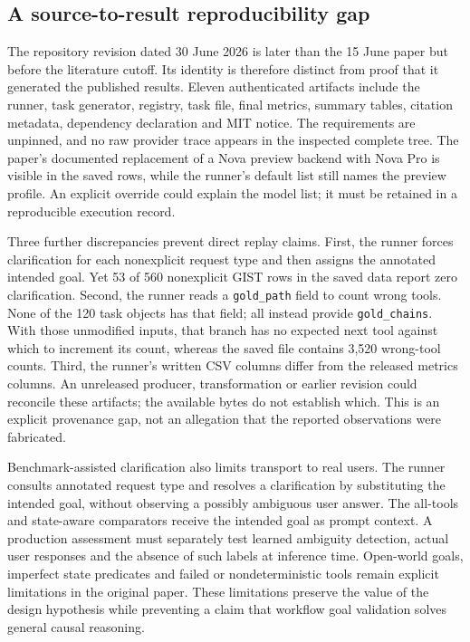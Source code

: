 \subsection{A source-to-result reproducibility gap}
\label{exec23:gist-provenance}
The repository revision dated 30 June 2026 is later than the 15 June paper
but before the literature cutoff. Its identity is therefore distinct from
proof that it generated the published results. Eleven authenticated artifacts
include the runner, task generator, registry, task file, final metrics,
summary tables, citation metadata, dependency declaration and MIT notice.
The requirements are unpinned, and no raw provider trace appears in the
inspected complete tree. The paper's documented replacement of a Nova preview
backend with Nova Pro is visible in the saved rows, while the runner's default
list still names the preview profile. An explicit override could explain the
model list; it must be retained in a reproducible execution record.
\citep{exec23_gist_sources}

Three further discrepancies prevent direct replay claims. First, the runner
forces clarification for each nonexplicit request type and then assigns the
annotated intended goal. Yet 53 of 560 nonexplicit GIST rows in the saved data
report zero clarification. Second, the runner reads a \texttt{gold\_path}
field to count wrong tools. None of the 120 task objects has that field;
all instead provide \texttt{gold\_chains}. With those unmodified inputs,
that branch has no expected next tool against which to increment its count,
whereas the saved file contains 3,520 wrong-tool counts. Third, the runner's
written CSV columns differ from the released metrics columns. An unreleased
producer, transformation or earlier revision could reconcile these artifacts;
the available bytes do not establish which. This is an explicit provenance
gap, not an allegation that the reported observations were fabricated.
\citep{exec23_gist_sources,exec23_gist_reference}

Benchmark-assisted clarification also limits transport to real users. The
runner consults annotated request type and resolves a clarification by
substituting the intended goal, without observing a possibly ambiguous user
answer. The all-tools and state-aware comparators receive the intended goal
as prompt context. A production assessment must separately test learned
ambiguity detection, actual user responses and the absence of such labels at
inference time. Open-world goals, imperfect state predicates and failed or
nondeterministic tools remain explicit limitations in the original paper.
These limitations preserve the value of the design hypothesis while preventing
a claim that workflow goal validation solves general causal reasoning.
\citep{exec23_gist_paper,exec23_gist_sources}

